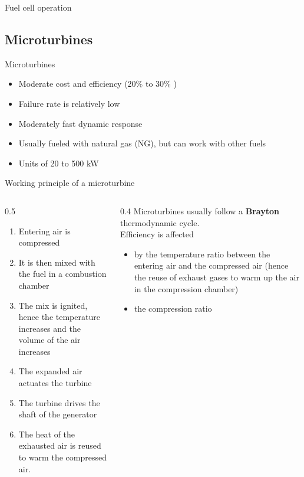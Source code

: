 \begin{frame}{Fuel cell operation}
\subsection{Microturbines}
\end{frame}\begin{frame}{Microturbines}
\begin{itemize}
  \item Moderate cost and efficiency (20\% to $30 \%$ )
  \item Failure rate is relatively low
  \item Moderately fast dynamic response
  \item Usually fueled with natural gas (NG), but can work with other fuels
  \item Units of 20 to 500 kW
\end{itemize}

\end{frame}

\begin{frame}{Working principle of a microturbine}

\begin{columns}
  \begin{column}{0.5\textwidth}
    \begin{enumerate}
      \item Entering air is compressed
      \item It is then mixed with the fuel in a combustion chamber
      \item The mix is ignited, hence the temperature increases and the volume of the air increases
      \item The expanded air actuates the turbine
      \item The turbine drives the shaft of the generator
      \item The heat of the exhausted air is reused to warm the compressed air.
    \end{enumerate}  
  \end{column}
  \begin{column}{0.4\textwidth}
    Microturbines usually follow a \textbf{Brayton} thermodynamic cycle.\\
    Efficiency is affected
    \begin{itemize}
      \item by the temperature ratio between the entering air and the compressed air (hence the reuse of exhaust gases to warm up the air in the compression chamber)
      \item the compression ratio
    \end{itemize}
  \end{column}
\end{columns}

\end{frame}

